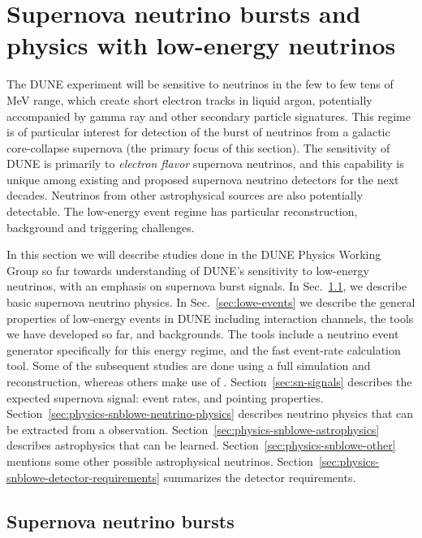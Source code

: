 \chapter{Supernova neutrino bursts and physics with low-energy neutrinos}
\label{ch:snb-lowe}


The DUNE experiment will be sensitive to neutrinos in the few to few
tens of MeV range, which create short electron tracks in liquid argon, potentially accompanied by
gamma ray and other secondary particle signatures.   
This regime is of
particular interest for detection of the burst of neutrinos from a galactic
core-collapse supernova (the primary focus of this section). 
The sensitivity of DUNE is primarily to \textit{electron flavor} supernova neutrinos, and this capability is unique among existing and proposed supernova neutrino detectors for the next decades.  
Neutrinos from other astrophysical sources are also potentially detectable.  
The low-energy event regime has particular reconstruction, background and triggering challenges.

In this section we will describe studies done in the DUNE %
Physics Working Group so far towards
understanding of DUNE's sensitivity to low-energy neutrinos, with an
emphasis on supernova burst signals.   In Sec.~\ref{sec:snb-lowe-snb},
we describe basic supernova neutrino physics.  In
Sec.~\ref{sec:lowe-events} we describe the general properties of
low-energy events in DUNE including interaction channels, the tools we
have developed so far, and backgrounds.  The tools include a neutrino event generator
specifically for this energy regime, and the  fast event-rate calculation tool.  Some of the subsequent studies are done using
a full simulation and reconstruction, whereas others make use of
 .
Section~\ref{sec:sn-signals} describes the
expected supernova signal: event rates, and pointing properties.
Section~\ref{sec:physics-snblowe-neutrino-physics} describes neutrino
physics that can be extracted from a  observation.
Section~\ref{sec:physics-snblowe-astrophysics} describes astrophysics
that can be learned.  Section~\ref{sec:physics-snblowe-other} mentions
some other possible astrophysical neutrinos.
Section~\ref{sec:physics-snblowe-detector-requirements} summarizes the
detector requirements.



\section{Supernova neutrino bursts}
\label{sec:snb-lowe-snb}




